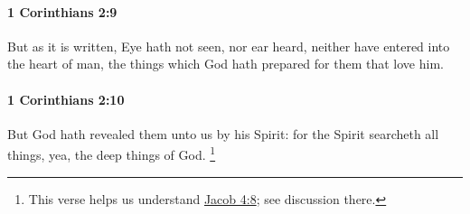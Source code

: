 		\paragraph{1 Corinthians 2:9} %
			\label{1CORINTHIANS-2-9}

			But as it is written, Eye hath not seen, nor ear heard, neither have entered into the heart of man, the things which God hath prepared for them that love him.

			\begin{framed}
			\scriptsize
				\begin{compactdesc}
					\item[SBLG] 
				\end{compactdesc}
			\end{framed}

		\paragraph{1 Corinthians 2:10} %
			\label{1CORINTHIANS-2-10}

			But God hath revealed them unto us by his Spirit: for the Spirit searcheth all things, yea, the deep things of God.%
				\footnote{%
					This verse helps us understand \hyperref[JACOB-4-8]{Jacob 4:8}; see discussion there.
					}

